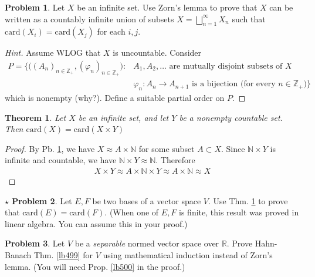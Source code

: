 \documentclass[12pt,b5paper,notitlepage]{article}
\theoremstyle{definition}
\newtheorem{prob}{\color{red}Problem}[section]
\newtheorem{sprob}[prob]{\color{red}$\star$ Problem}
\theoremstyle{plain}
\newtheorem{thm}[df]{Theorem}
\newcommand{\Nbb}{\mathbb N}
\newcommand{\Zbb}{\mathbb Z}
\newcommand{\Rbb}{\mathbb R}
\newcommand{\card}{\mathrm{card}}
\numberwithin{equation}{section}
\begin{document}
\begin{prob}\label{lb496}
Let $X$ be an infinite set. Use Zorn's lemma to prove that $X$ can be written as a countably infinite union  of subsets $X=\bigsqcup_{n=1}^\infty X_n$ such that $\card(X_i)=\card(X_j)$ for each $i,j$.
\end{prob}


\begin{proof}[Hint]
Assume WLOG that $X$ is uncountable. Consider
\begin{align*}
P=\Big\{\big((A_n)_{n\in\Zbb_+},(\varphi_n)_{n\in\Zbb_+} \big):&A_1,A_2,\dots\text{ are mutually disjoint subsets of }X\\
&\varphi_n:A_n\rightarrow A_{n+1}\text{ is a bijection (for every $n\in\Zbb_+$)}\Big\}
\end{align*}
which is nonempty (why?). Define a suitable partial order on $P$.
\end{proof}



\begin{thm}\label{lb497}
Let $X$ be an infinite set, and let $Y$ be a nonempty countable set. Then $\card(X)=\card(X\times Y)$
\end{thm}

\begin{proof}
By Pb. \ref{lb496}, we have $X\approx A\times\Nbb$ for some subset $A\subset X$. Since  $\Nbb\times Y$ is infinite and countable, we have $\Nbb\times Y\approx \Nbb$. Therefore
\begin{align*}
X\times Y\approx A\times \Nbb\times Y\approx A\times \Nbb\approx X
\end{align*}
\end{proof}


\begin{sprob}
Let $E,F$ be two bases of a vector space $V$. Use Thm. \ref{lb497} to prove that $\card(E)=\card(F)$. (When one of $E,F$ is finite, this result was proved in linear algebra. You can assume this in your proof.)
\end{sprob}

\begin{prob}\label{lb501}
Let $V$ be a  \textit{separable} normed vector space over $\Rbb$. Prove Hahn-Banach Thm. \ref{lb499} for $V$ using mathematical induction instead of Zorn's lemma. (You will need Prop. \ref{lb500} in the proof.)
\end{prob}
\end{document}
